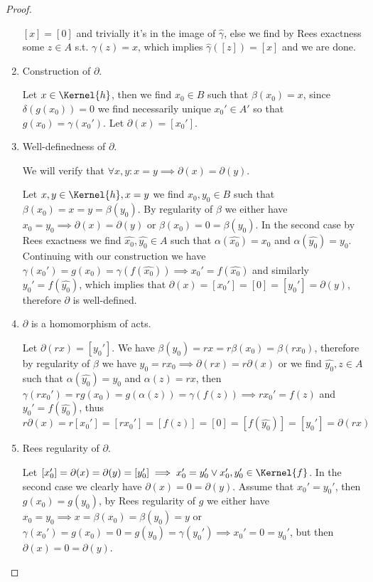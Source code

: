 \begin{proof}[Proof]
\begin{enumerate}
        $[x]=[0]$ and trivially it's in the image of $\hat{\gamma}$, else we find by Rees exactness some $z\in A$ s.t. $\gamma(z)=x$, which implies 
        $\hat{\gamma}([z])=[x]$ and we are done.
        \item Construction of $\partial$.\par 
        Let $x\in\Kernel{h}$, then we find $x_0\in B$ such that $\beta(x_0)=x$, since $\delta(g(x_0))=0$ we find 
        necessarily unique $x_0'\in A'$ so that $g(x_0)=\gamma(x_0')$. Let $\partial(x) = [x_0']$.
        \item Well-definedness of $\partial$. \par
        We will verify that $\forall x,y : x=y \implies \partial(x)=\partial(y)$.\par
        Let $x,y\in\Kernel{h},x=y$ we find $x_0,y_0\in B$ such that $\beta(x_0)=x=y=\beta(y_0)$. By regularity of $\beta$ 
        we either have $x_0=y_0 \implies \partial(x)=\partial(y)$ or $\beta(x_0)=0=\beta(y_0)$. In the second case
        by Rees exactness we find $\hat{x_0},\hat{y_0}\in A$ such that $\alpha(\hat{x_0})=x_0$ and $\alpha(\hat{y_0})=y_0$. 
        Continuing with our construction we have 
        $\gamma(x_0')=g(x_0)=\gamma(f(\hat{x_0})) \implies x_0'=f(\hat{x_0})$ and similarly $y_0'=f(\hat{y_0})$,
        which implies that $\partial(x)=[x_0']=[0]=[y_0']=\partial(y)$, therefore $\partial$ is well-defined.
        \item $\partial$ is a homomorphism of acts.\par 
        Let $\partial(rx)=[y_0']$. We have $\beta(y_0)=rx=r\beta(x_0)=\beta(rx_0)$, therefore by regularity of $\beta$ 
        we have $y_0=rx_0 \implies \partial(rx)=r\partial(x)$ or we find $\hat{y_0},z\in A$ such that 
        $\alpha(\hat{y_0})=y_0$ and $\alpha(z)= rx$, then  $\gamma(rx_0')=rg(x_0)=g(\alpha(z))=\gamma(f(z)) \implies rx_0'=f(z)$
        and $y_0' = f(\hat{y_0})$, thus
        \[
            r\partial(x)=r[x_0']=[rx_0']=[f(z)]=[0]=[f(\hat{y_0})]=[y_0']=\partial(rx)
        \] 
        \item Rees regularity of $\partial$.\par
        Let $[x_0']=\partial(x)=\partial(y)=[y_0'] \implies x_0'=y_0' \lor x_0',y_0'\in\Kernel{f}$. In the second case 
        we clearly have $\partial(x)=0=\partial(y)$. Assume that $x_0'=y_0'$, then $g(x_0)=g(y_0)$, by Rees regularity of $g$
        we either have $x_0=y_0 \implies x=\beta(x_0)=\beta(y_0)=y$ or $\gamma(x_0')=g(x_0)=0=g(y_0)=\gamma(y_0') \implies x_0'=0=y_0'$, 
        but then $\partial(x)=0=\partial(y)$.

\end{enumerate}
\end{proof}
